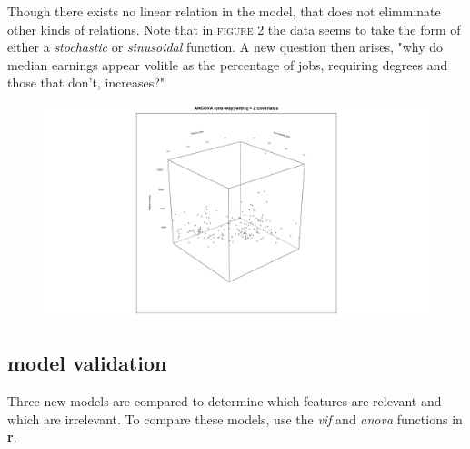 \documentclass[10pt, twoside, openleft]{article}
\begin{document}
\noindent
Though there exists no linear relation in the model, that does not elimminate
other kinds of relations. Note that in \textsc{figure 2} the data seems to take
the form of either a \emph{stochastic} or \emph{sinusoidal} function. A new
question then arises, "why do median earnings appear volitle as the percentage of
jobs, requiring degrees and those that don't, increases?"
\smallskip

\begin{figure}[H]
\centering
\includegraphics[scale=0.365]{plot1}
\caption{}
\end{figure}

\begin{center}
\subsection{model validation}
\vspace{-3ex}
\end{center}

\noindent
Three new models are compared to determine which features are relevant and which are
irrelevant. To compare these models, use the \emph{vif} and \emph{anova} functions in \textbf{r}.
\smallskip
\end{document}
